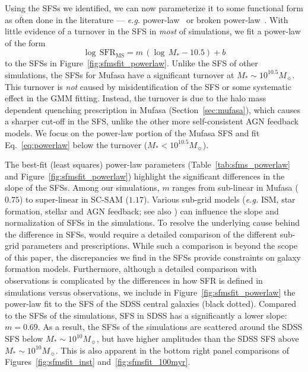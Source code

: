 \documentclass[tighten, preprint]{aastex62}
\begin{document}
Using the SFSs we identified, we can now parameterize it to 
some functional form as often done in the literature --- \emph{e.g.} 
power-law~\citep{speagle2014} or broken power-law~\citep{lee2015}. With 
little evidence of a turnover in the SFS in {\em most} of simulations, 
we fit a power-law of the form 
\begin{equation} \label{eq:powerlaw}
\log\,\mathrm{SFR}_\mathrm{MS} = m\,(\log\,M_* - 10.5) + b
\end{equation}
to the SFSs in Figure~\ref{fig:sfmsfit_powerlaw}. Unlike the SFS of 
other simulations, the SFSs for {\sc Mufasa} have a significant 
turnover at $M_*{\sim}10^{10.5}M_\sun$. This turnover is \emph{not} 
caused by  misidentification of the SFS or some systematic effect in the 
GMM fitting. Instead, the turnover is due to the halo mass 
dependent quenching prescription in {\sc Mufasa} (Section~\ref{sec:mufasa}), 
which causes a sharper cut-off in the SFS, unlike the other more 
self-consistent AGN feedback models. We focus on the power-law portion 
of the {\sc Mufasa} SFS and fit Eq.~\ref{eq:powerlaw} below the turnover 
($M_*{<}10^{10.5} M_\sun$). 

The best-fit (least squares) power-law parameters (Table~\ref{tab:sfms_powerlaw} 
and Figure~\ref{fig:sfmsfit_powerlaw}) highlight the significant %
differences in the slope of the SFSs. Among our simulations, $m$ ranges 
from sub-linear in {\sc Mufasa} ($0.75$) to super-linear in SC-SAM ($1.17$).  
Various sub-grid models (\emph{e.g.} ISM, star  formation, stellar and 
AGN feedback; see also \citealt{torrey2014}) can influence the slope 
and normalization of SFSs in the 
simulations. To resolve the underlying cause behind the difference in SFSs, 
would require a detailed comparison of the different sub-grid parameters 
and prescriptions. While such a comparison is beyond the scope of this 
paper, the discrepancies we find in the SFSs provide constraints on 
galaxy formation models. Furthermore,
although a detailed comparison with observations is complicated by the 
differences in how SFR is defined in simulations versus observations, 
we include in Figure~\ref{fig:sfmsfit_powerlaw} the power-law fit to the 
SFS of the SDSS central galaxies (black dotted). Compared to the SFSs of the 
simulations, SFS in SDSS has a significantly a lower slope: $m=0.69$. As a 
result, the SFSs of the simulations are scattered around the SDSS SFS 
below $M_*{\sim}10^{10} M_\sun$, but have higher amplitudes than the SDSS SFS 
above $M_*{\sim}10^{10} M_\sun$. This is also apparent in the bottom right 
panel comparisons of Figures~\ref{fig:sfmsfit_inst} and~\ref{fig:sfmsfit_100myr}. 
\end{document}
